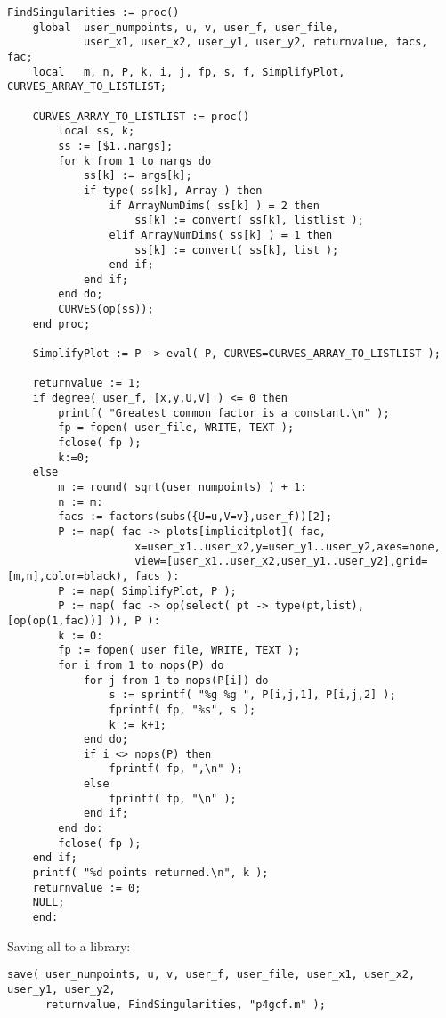 \documentclass[a4paper,10pt]{article}
\begin{document}
\begin{lstlisting}[name=p4gcf]
FindSingularities := proc()
    global  user_numpoints, u, v, user_f, user_file,
            user_x1, user_x2, user_y1, user_y2, returnvalue, facs, fac;
    local   m, n, P, k, i, j, fp, s, f, SimplifyPlot, CURVES_ARRAY_TO_LISTLIST;

    CURVES_ARRAY_TO_LISTLIST := proc()
        local ss, k;
        ss := [$1..nargs];
        for k from 1 to nargs do
            ss[k] := args[k];
            if type( ss[k], Array ) then
                if ArrayNumDims( ss[k] ) = 2 then
                    ss[k] := convert( ss[k], listlist );
                elif ArrayNumDims( ss[k] ) = 1 then
                    ss[k] := convert( ss[k], list );
                end if;
            end if;
        end do;
        CURVES(op(ss));
    end proc;
    
    SimplifyPlot := P -> eval( P, CURVES=CURVES_ARRAY_TO_LISTLIST );
    
    returnvalue := 1;
    if degree( user_f, [x,y,U,V] ) <= 0 then
        printf( "Greatest common factor is a constant.\n" );
        fp = fopen( user_file, WRITE, TEXT );
        fclose( fp );
        k:=0;
    else
        m := round( sqrt(user_numpoints) ) + 1:
        n := m:
        facs := factors(subs({U=u,V=v},user_f))[2];
        P := map( fac -> plots[implicitplot]( fac,
                    x=user_x1..user_x2,y=user_y1..user_y2,axes=none,
                    view=[user_x1..user_x2,user_y1..user_y2],grid=[m,n],color=black), facs ):
        P := map( SimplifyPlot, P );
        P := map( fac -> op(select( pt -> type(pt,list), [op(op(1,fac))] )), P ):
        k := 0:
        fp := fopen( user_file, WRITE, TEXT );
        for i from 1 to nops(P) do
            for j from 1 to nops(P[i]) do
                s := sprintf( "%g %g ", P[i,j,1], P[i,j,2] );
                fprintf( fp, "%s", s );
                k := k+1;
            end do;
            if i <> nops(P) then
                fprintf( fp, ",\n" );
            else
                fprintf( fp, "\n" );
            end if;
        end do:
        fclose( fp );
    end if;
    printf( "%d points returned.\n", k );
    returnvalue := 0;
    NULL;
    end:
\end{lstlisting}

Saving all to a library:

\begin{lstlisting}[name=p4gcf]
save( user_numpoints, u, v, user_f, user_file, user_x1, user_x2, user_y1, user_y2,
      returnvalue, FindSingularities, "p4gcf.m" );
\end{lstlisting}
\end{document}
